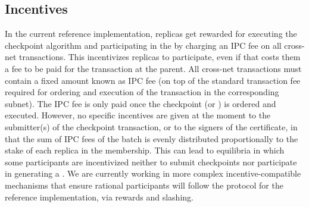 \subsection{Incentives} 
\label{sec:refimplincentives}
In the current reference implementation, replicas get rewarded for executing the checkpoint algorithm and participating in the \tcheckpoint by charging an IPC fee on all cross-net transactions. This incentivizes replicas to participate, even if that costs them a fee to be paid for the transaction at the parent. All cross-net transactions must contain a fixed amount known as IPC fee (on top of the standard transaction fee required for ordering and execution of the transaction in the corresponding subnet). The IPC fee is only paid once the checkpoint (or \tcheckpoint) is ordered and executed. However, no specific incentives are given at the moment to the submitter(s) of the checkpoint transaction, or to the signers of the certificate, in that the sum of IPC fees of the batch is evenly distributed proportionally to the stake of each replica in the membership. This can lead to equilibria in which some participants are incentivized neither to submit checkpoints nor participate in generating a 
\pof. We are currently working in more complex incentive-compatible mechanisms that ensure rational participants will follow the protocol for the reference implementation, via rewards and slashing.

